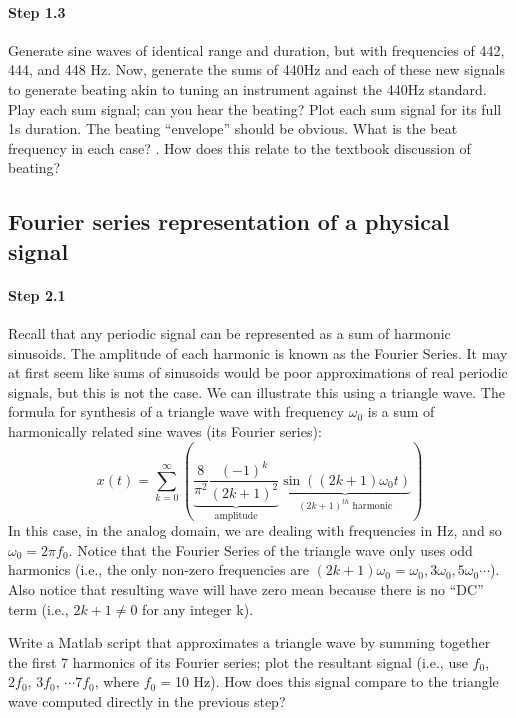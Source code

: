 \paragraph{Step 1.3} Generate sine waves of identical range and
duration, but with frequencies of 442, 444, and 448 Hz. Now, generate
the sums of 440Hz and each of these new signals to generate beating
akin to tuning an instrument against the 440Hz standard. Play each sum
signal; can you hear the beating? Plot each sum signal for its full 1s
duration. The beating ``envelope'' should be obvious. What is the beat
frequency in each case? . How does this relate to the textbook
discussion of beating?


\subsection{Fourier series representation of a physical signal}


\paragraph{Step 2.1} Recall that any periodic signal can be
represented as a sum of harmonic sinusoids.  The amplitude of each
harmonic is known as the Fourier Series. It may at first seem like
sums of sinusoids would be poor approximations of real periodic
signals, but this is not the case. We can illustrate this using a
triangle wave. The formula for synthesis of a triangle wave with
frequency $\omega_0$ is a sum of harmonically related sine waves (its
Fourier series):
  \[
  x(t) = \sum_{k=0}^{\infty}
  \left( 
    \underbrace{ \frac{8}{\pi^2} \frac{(-1)^k}{(2k+ 1)^2} }_{ \text{amplitude} } 
    \underbrace{ \sin((2k+1)\omega_0 t) }_{ (2k+1)^{th}\text{ harmonic} } 
  \right)
  \]
  In this case, in the analog domain, we are dealing with frequencies
  in Hz, and so $\omega_0 = 2\pi f_0$. Notice that the Fourier Series
  of the triangle wave only uses odd harmonics (i.e., the only
  non-zero frequencies are $(2k+1)\omega_0=\omega_0, 3\omega_0,
  5\omega_0 \cdots$). Also notice that resulting wave will have zero
  mean because there is no ``DC'' term (i.e., $2k+1 \neq 0$ for any
  integer k).

  Write a Matlab script that approximates a triangle wave by summing
  together the first 7 harmonics of its Fourier series; plot the
  resultant signal (i.e., use $f_0$, $2f_0$, $3f_0$, $\cdots 7f_0$,
  where $f_0=$10 Hz). How does this signal compare to the triangle
  wave computed directly in the previous step?



